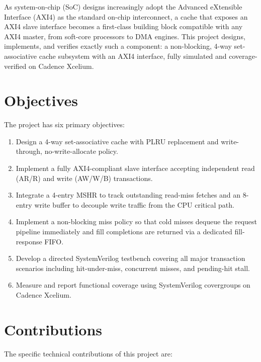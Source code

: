 \documentclass[12pt,letterpaper]{report}
\begin{document}
As system-on-chip (SoC) designs increasingly adopt the Advanced
eXtensible Interface (AXI4) as the standard on-chip interconnect, a
cache that exposes an AXI4 slave interface becomes a first-class
building block compatible with any AXI4 master, from soft-core
processors to DMA engines.  This project designs, implements, and
verifies exactly such a component: a non-blocking, 4-way
set-associative cache subsystem with an AXI4 interface, fully
simulated and coverage-verified on Cadence Xcelium.

\section{Objectives}

The project has six primary objectives:

\begin{enumerate}[label=\arabic*.]
  \item Design a 4-way set-associative cache with PLRU replacement
        and write-through, no-write-allocate policy.
  \item Implement a fully AXI4-compliant slave interface accepting
        independent read (AR/R) and write (AW/W/B) transactions.
  \item Integrate a 4-entry MSHR to track outstanding read-miss
        fetches and an 8-entry write buffer to decouple write
        traffic from the CPU critical path.
  \item Implement a non-blocking miss policy so that cold misses
        dequeue the request pipeline immediately and fill completions
        are returned via a dedicated fill-response FIFO.
  \item Develop a directed SystemVerilog testbench covering all
        major transaction scenarios including hit-under-miss,
        concurrent misses, and pending-hit stall.
  \item Measure and report functional coverage using SystemVerilog
        covergroups on Cadence Xcelium.
\end{enumerate}

\section{Contributions}

The specific technical contributions of this project are:
\end{document}
